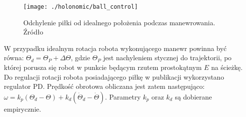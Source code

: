 \begin{figure}[h]
\centering
\texttt{[image: ./holonomic/ball\_control]}
\caption{ Odchylenie piłki od idealnego położenia podczas manewrowania. Źródło \cite{dribbling} }\label{fig:ball_control}
\end{figure}
W przypadku idealnym rotacja robota wykonującego manewr powinna być równa: $\Theta_{d}=\Theta_{P} + \Delta\Theta$, gdzie $\Theta_{P}$ jest nachyleniem stycznej do trajektorii, po której porusza się robot w punkcie
będącym rzutem prostokątnym $E$ na ścieżkę.  Do regulacji rotacji robota posiadającego piłkę w publikacji \cite{dribbling}
wykorzystano regulator PD. Prędkość obrotowa obliczana jest zatem następująco: $\omega=k_p(\Theta_d -\Theta) +k_d(\dot{\Theta}_d -\dot{\Theta} )$. Parametry $k_p$ oraz $k_d$ są dobierane empirycznie.

